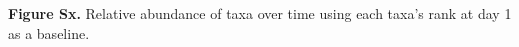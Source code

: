 \textbf{Figure Sx.} Relative abundance of taxa over time using each taxa's rank at day 1 as a baseline.  